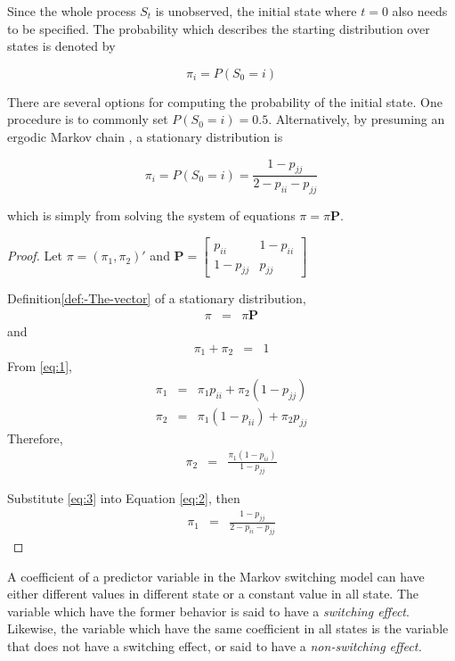 Since the whole process $S_{t}$ is unobserved, the initial state
where $t=0$ also needs to be specified. The probability which describes
the starting distribution over states is denoted by

\[
\pi_{i}=P(S_{0}=i)
\]

There are several options for computing the probability of the initial
state. One procedure is to commonly set $P(S_{0}=i)=0.5$. Alternatively,
by presuming an ergodic Markov chain \citep{hamilton2005regime},
a stationary distribution is 

\[
\pi_{i}=P(S_{0}=i)=\frac{1-p_{jj}}{2-p_{ii}-p_{jj}}
\]

which is simply from solving the system of equations $\pi=\pi\mathbf{P}$. 
\begin{proof}
Let $\pi=(\pi_{1},\pi_{2})'$ and $\mathbf{P}=\left[\begin{array}{cc}
p_{ii} & 1-p_{ii}\\
1-p_{jj} & p_{jj}
\end{array}\right]$

Definition\ref{def:-The-vector} of a stationary distribution, 
\begin{eqnarray}
\pi & = & \pi\mathbf{P}\label{eq:1}
\end{eqnarray}
and
\begin{eqnarray}
\pi_{1}+\pi_{2} & = & 1\label{eq:2}
\end{eqnarray}
From \ref{eq:1},
\begin{eqnarray*}
\pi_{1} & = & \pi_{1}p_{ii}+\pi_{2}(1-p_{jj})\\
\pi_{2} & = & \pi_{1}(1-p_{ii})+\pi_{2}p_{jj}
\end{eqnarray*}
Therefore,
\begin{eqnarray}
\pi_{2} & = & \frac{\pi_{1}(1-p_{ii})}{1-p_{jj}}\label{eq:3}
\end{eqnarray}

Substitute \ref{eq:3} into Equation \ref{eq:2}, then
\begin{eqnarray*}
\pi_{1} & = & \frac{1-p_{jj}}{2-p_{ii}-p_{jj}}
\end{eqnarray*}
\end{proof}
A coefficient of a predictor variable in the Markov switching model
can have either different values in different state or a constant
value in all state. The variable which have the former behavior is
said to have a \emph{switching effect}. Likewise, the variable which
have the same coefficient in all states is the variable that does
not have a switching effect, or said to have a \emph{non-switching
effect.} 

